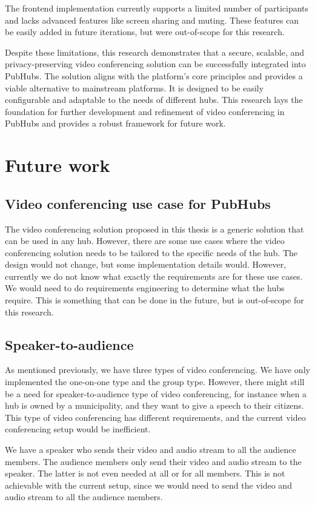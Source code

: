 \documentclass{report}
\begin{document}
The frontend implementation currently supports a limited number of participants and lacks advanced features like
screen sharing and muting. These features can be easily added in future iterations, but were out-of-scope for this
research.

Despite these limitations, this research demonstrates that a secure, scalable, and privacy-preserving video
conferencing solution can be successfully integrated into PubHubs. The solution aligns with the platform’s core
principles and provides a viable alternative to mainstream platforms. It is designed to be easily configurable and
adaptable to the needs of different hubs. This research lays the foundation for further development and refinement
of video conferencing in PubHubs and provides a robust framework for future work.

\chapter{Future work}
\section{Video conferencing use case for PubHubs}
The video conferencing solution proposed in this thesis is a generic solution that can be used in any hub. However,
there are some use cases where the video conferencing solution needs to be tailored to the specific needs of the hub.
The design would not change, but some implementation details would. However, currently we do not know what exactly the
requirements are for these use cases. We would need to do requirements engineering to determine what the hubs require.
This is something that can be done in the future, but is out-of-scope for this research.

\section{Speaker-to-audience}
As mentioned previously, we have three types of video conferencing. We have only implemented the one-on-one type and
the group type. However, there might still be a need for speaker-to-audience type of video conferencing, for instance
when a hub is owned by a municipality, and they want to give a speech to their citizens. This type of video conferencing
has different requirements, and the current video conferencing setup would be inefficient.

We have a speaker who sends their video and audio stream to all the audience members. The audience members only send
their video and audio stream to the speaker. The latter is not even needed at all or for all members. This is not
achievable with the current setup, since we would need to send the video and audio stream to all the audience members.
\end{document}
